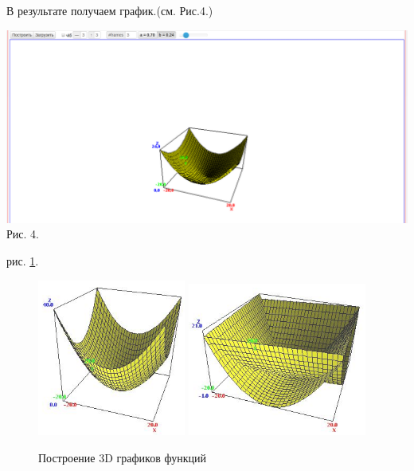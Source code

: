 В результате получаем график.(см. Рис.4.)

\includegraphics[scale=0.35]{pictures/3_12}
Рис. 4.


 
{рис. \ref{3_7}.}

\begin{figure}[!ht]
  \includegraphics[width=138pt, height=146pt]{pictures/3_7}
  \includegraphics[width=166.5pt, height=143pt]{pictures/3_8}
  \caption{Построение 3D графиков функций}
  \label{3_7}
\end{figure}


